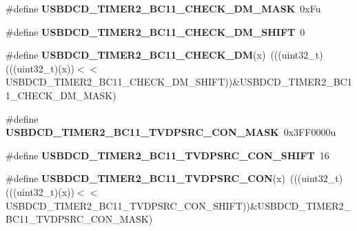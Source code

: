 \begin{DoxyCompactItemize}
\item 
\#define {\bfseries U\+S\+B\+D\+C\+D\+\_\+\+T\+I\+M\+E\+R2\+\_\+\+B\+C11\+\_\+\+C\+H\+E\+C\+K\+\_\+\+D\+M\+\_\+\+M\+A\+SK}~0x\+Fu\hypertarget{group__USBDCD__Register__Masks_ga0b011ea67418c2cb8e3a45f396fd8819}{}\label{group__USBDCD__Register__Masks_ga0b011ea67418c2cb8e3a45f396fd8819}

\item 
\#define {\bfseries U\+S\+B\+D\+C\+D\+\_\+\+T\+I\+M\+E\+R2\+\_\+\+B\+C11\+\_\+\+C\+H\+E\+C\+K\+\_\+\+D\+M\+\_\+\+S\+H\+I\+FT}~0\hypertarget{group__USBDCD__Register__Masks_gaa0b16aa7f0c9f3713c738c0d63b3d647}{}\label{group__USBDCD__Register__Masks_gaa0b16aa7f0c9f3713c738c0d63b3d647}

\item 
\#define {\bfseries U\+S\+B\+D\+C\+D\+\_\+\+T\+I\+M\+E\+R2\+\_\+\+B\+C11\+\_\+\+C\+H\+E\+C\+K\+\_\+\+DM}(x)~(((uint32\+\_\+t)(((uint32\+\_\+t)(x))$<$$<$U\+S\+B\+D\+C\+D\+\_\+\+T\+I\+M\+E\+R2\+\_\+\+B\+C11\+\_\+\+C\+H\+E\+C\+K\+\_\+\+D\+M\+\_\+\+S\+H\+I\+FT))\&U\+S\+B\+D\+C\+D\+\_\+\+T\+I\+M\+E\+R2\+\_\+\+B\+C11\+\_\+\+C\+H\+E\+C\+K\+\_\+\+D\+M\+\_\+\+M\+A\+SK)\hypertarget{group__USBDCD__Register__Masks_ga934bb0d81810c5aa1deebbe47fe86d4d}{}\label{group__USBDCD__Register__Masks_ga934bb0d81810c5aa1deebbe47fe86d4d}

\item 
\#define {\bfseries U\+S\+B\+D\+C\+D\+\_\+\+T\+I\+M\+E\+R2\+\_\+\+B\+C11\+\_\+\+T\+V\+D\+P\+S\+R\+C\+\_\+\+C\+O\+N\+\_\+\+M\+A\+SK}~0x3\+F\+F0000u\hypertarget{group__USBDCD__Register__Masks_gad0058047f4d8025f1ea9139d1b505b51}{}\label{group__USBDCD__Register__Masks_gad0058047f4d8025f1ea9139d1b505b51}

\item 
\#define {\bfseries U\+S\+B\+D\+C\+D\+\_\+\+T\+I\+M\+E\+R2\+\_\+\+B\+C11\+\_\+\+T\+V\+D\+P\+S\+R\+C\+\_\+\+C\+O\+N\+\_\+\+S\+H\+I\+FT}~16\hypertarget{group__USBDCD__Register__Masks_ga11ac4ed3e448170b1b94578b8398e2dd}{}\label{group__USBDCD__Register__Masks_ga11ac4ed3e448170b1b94578b8398e2dd}

\item 
\#define {\bfseries U\+S\+B\+D\+C\+D\+\_\+\+T\+I\+M\+E\+R2\+\_\+\+B\+C11\+\_\+\+T\+V\+D\+P\+S\+R\+C\+\_\+\+C\+ON}(x)~(((uint32\+\_\+t)(((uint32\+\_\+t)(x))$<$$<$U\+S\+B\+D\+C\+D\+\_\+\+T\+I\+M\+E\+R2\+\_\+\+B\+C11\+\_\+\+T\+V\+D\+P\+S\+R\+C\+\_\+\+C\+O\+N\+\_\+\+S\+H\+I\+FT))\&U\+S\+B\+D\+C\+D\+\_\+\+T\+I\+M\+E\+R2\+\_\+\+B\+C11\+\_\+\+T\+V\+D\+P\+S\+R\+C\+\_\+\+C\+O\+N\+\_\+\+M\+A\+SK)\hypertarget{group__USBDCD__Register__Masks_gafe8c25b0327bf55ecb4069581007a9f7}{}\label{group__USBDCD__Register__Masks_gafe8c25b0327bf55ecb4069581007a9f7}


\end{DoxyCompactItemize}
